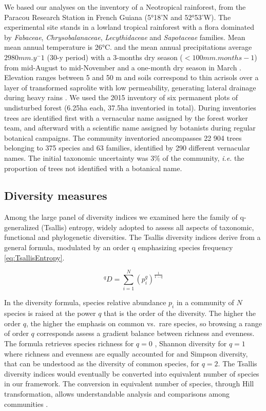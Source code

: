 \documentclass[fleqn,10pt]{ArtEcoFoG} %
\begin{document}
We based our analyses on the inventory of a Neotropical rainforest, from
the Paracou Research Station in French Guiana (5°18'N and 52°53'W). The
experimental site stands in a lowland tropical rainforest with a flora
dominated by \emph{Fabaceae}, \emph{Chrysobalanaceae},
\emph{Lecythidaceae} and \emph{Sapotaceae} families. Mean mean annual
temperature is 26°C. and the mean annual precipitations average
\(2980 mm.y^-1\) (30-y period) with a 3-months dry season
(\(< 100 mm.months-1\)) from mid-August to mid-November and a one-month
dry season in March \citep{Wagner2011}. Elevation ranges between 5 and
50 m and soils correspond to thin acrisols over a layer of transformed
saprolite with low permeability, generating lateral drainage during
heavy rains \citep{IUSSWorkingGroupWRB2015}. We used the 2015 inventory
of six permanent plots of undisturbed forest (6.25ha each, 37.5ha
inventoried in total). During inventories trees are identified first
with a vernacular name assigned by the forest worker team, and afterward
with a scientific name assigned by botanists during regular botanical
campaigns. The community inventoried ancompasses 22 904 trees belonging
to 375 species and 63 families, identified by 290 different vernacular
names. The initial taxonomic uncertainty was 3\% of the community,
\emph{i.e.} the proportion of trees not identified with a botanical
name.

\subsection{Diversity measures}\label{diversity-measures}

Among the large panel of diversity indices we examined here the family
of q-generalized (Tsallis) entropy, widely adopted to assess all aspects
of taxonomic, functional and phylogenetic diversities. The Tsallis
diversity indices derive from a general formula, modulated by an order q
emphasizing species frequency \eqref{eq:TsallisEntropy}.

\begin{equation}
^qD = \sum_{i=1}^{N}{\left( p_i^q \right)^{\frac{1}{1-q}} }
\label{eq:TsallisEntropy}
\end{equation}

In the diversity formula, species relative abundance \(p_i\) in a
community of \(N\) species is raised at the power \(q\) that is the
order of the diversity. The higher the order \(q\), the higher the
emphasis on common vs.~rare species, so browsing a range of order \(q\)
corresponds assess a gradient balance between richness and evenness. The
formula retrieves species richness for \(q = 0\) , Shannon diversity for
\(q = 1\) where richness and evenness are equally accounted for and
Simpson diversity, that can be undestood as the diversity of common
species, for \(q = 2\). The Tsallis diversity indices would eventually
be converted into equivalent number of species in our framework. The
conversion in equivalent number of species, through Hill transformation,
allows understandable analysis and comparisons among communities
\citep{Hill1973, Keylock2005, Jost2006}.
\end{document}
